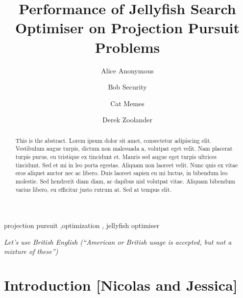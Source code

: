 \documentclass[
  number,
  preprint,
  3p]{elsarticle}
\begin{document}
\begin{frontmatter}
\title{Performance of Jellyfish Search Optimiser on Projection Pursuit
Problems}
\author[1]{Alice Anonymous%
%
}
\author[2]{Bob Security%
%
}
\author[2]{Cat Memes%
%
}
\author[]{Derek Zoolander%
%
}






        
\begin{abstract}
This is the abstract. Lorem ipsum dolor sit amet, consectetur adipiscing
elit. Vestibulum augue turpis, dictum non malesuada a, volutpat eget
velit. Nam placerat turpis purus, eu tristique ex tincidunt et. Mauris
sed augue eget turpis ultrices tincidunt. Sed et mi in leo porta
egestas. Aliquam non laoreet velit. Nunc quis ex vitae eros aliquet
auctor nec ac libero. Duis laoreet sapien eu mi luctus, in bibendum leo
molestie. Sed hendrerit diam diam, ac dapibus nisl volutpat vitae.
Aliquam bibendum varius libero, eu efficitur justo rutrum at. Sed at
tempus elit.
\end{abstract}





\begin{keyword}
    projection pursuit \sep optimization \sep 
    jellyfish optimiser
\end{keyword}
\end{frontmatter}
    \ifdefined\Shaded\renewenvironment{Shaded}{\begin{tcolorbox}[breakable, frame hidden, sharp corners, boxrule=0pt, borderline west={3pt}{0pt}{shadecolor}, interior hidden, enhanced]}{\end{tcolorbox}}\fi

\emph{Let's use British English (``American or British usage is
accepted, but not a mixture of these'')}

\hypertarget{introduction-nicolas-and-jessica}{%
\section{Introduction {[}Nicolas and
Jessica{]}}\label{introduction-nicolas-and-jessica}}
\end{document}
